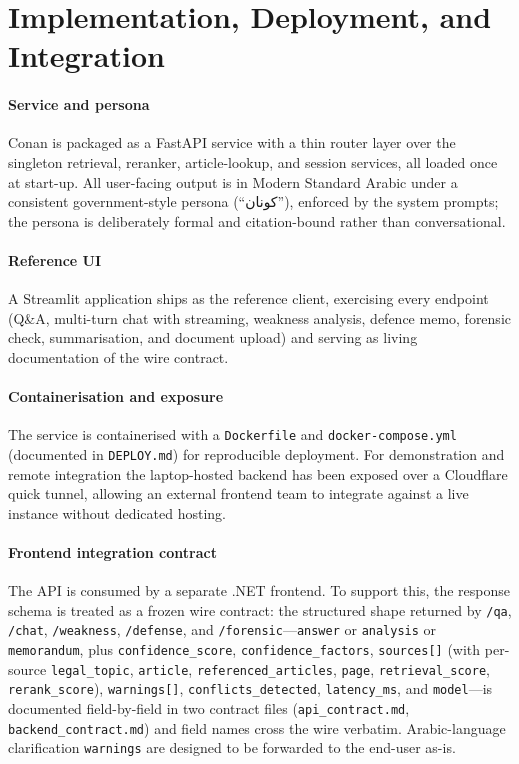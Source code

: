 \documentclass[final,1p,times]{elsarticle}
\newcommand{\ar}[1]{{\arabicfont\beginR #1\endR}}
\begin{document}
\section{Implementation, Deployment, and Integration}\label{sec:deploy}

\paragraph{Service and persona} Conan is packaged as a FastAPI service with a
thin router layer over the singleton retrieval, reranker, article-lookup, and
session services, all loaded once at start-up. All user-facing output is in
Modern Standard Arabic under a consistent government-style persona
(``\ar{كونان}''), enforced by the system prompts; the persona is deliberately
formal and citation-bound rather than conversational.

\paragraph{Reference UI} A Streamlit application ships as the reference
client, exercising every endpoint (Q\&A, multi-turn chat with streaming,
weakness analysis, defence memo, forensic check, summarisation, and document
upload) and serving as living documentation of the wire contract.

\paragraph{Containerisation and exposure} The service is containerised with a
\texttt{Dockerfile} and \texttt{docker-compose.yml} (documented in
\texttt{DEPLOY.md}) for reproducible deployment. For demonstration and remote
integration the laptop-hosted backend has been exposed over a Cloudflare quick
tunnel, allowing an external frontend team to integrate against a live
instance without dedicated hosting.

\paragraph{Frontend integration contract} The API is consumed by a separate
.NET frontend. To support this, the response schema is treated as a frozen
wire contract: the structured shape returned by \texttt{/qa}, \texttt{/chat},
\texttt{/weakness}, \texttt{/defense}, and \texttt{/forensic}---\texttt{answer}
or \texttt{analysis} or \texttt{memorandum}, plus \texttt{confidence\_score},
\texttt{confidence\_factors}, \texttt{sources[]} (with per-source
\texttt{legal\_topic}, \texttt{article}, \texttt{referenced\_articles},
\texttt{page}, \texttt{retrieval\_score}, \texttt{rerank\_score}),
\texttt{warnings[]}, \texttt{conflicts\_detected}, \texttt{latency\_ms}, and
\texttt{model}---is documented field-by-field in two contract files
(\texttt{api\_contract.md}, \texttt{backend\_contract.md}) and field names
cross the wire verbatim. Arabic-language clarification \texttt{warnings} are
designed to be forwarded to the end-user as-is.
\end{document}
